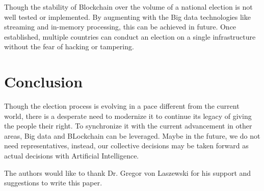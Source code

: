 \documentclass[sigconf]{acmart}
\begin{document}
Though the stability of Blockchain over the volume of a national election is not well tested or implemented. By augmenting with the Big data technologies like streaming and in-memory processing, this can be achieved in future. Once established, multiple countries can conduct an election on a single infrastructure without the fear of hacking or tampering.

\section{Conclusion}
Though the election process is evolving in a pace different from the current world, there is a desperate need to modernize it to continue its legacy of giving the people their right. To synchronize it with the current advancement in other areas, Big data and BLockchain can be leveraged.
Maybe in the future, we do not need representatives, instead, our collective decisions may be taken forward as actual decisions with Artificial Intelligence.

\begin{acks}

  The authors would like to thank Dr. Gregor von Laszewski for his
  support and suggestions to write this paper.
\end{acks}


 


\end{document}

